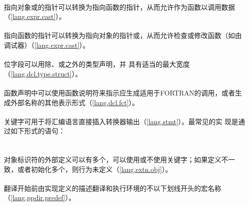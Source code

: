 \paragraph{}
指向对象或的指针可以转换为指向函数的指针，从而允许作为函数以调用数据
（\ref{lang.expr.cast}）。

\paragraph{}
指向函数的指针可以转换为指向对象的指针或，从而允许检查或修改函数（如由
调试器）（\ref{lang.expr.cast}）。

\paragraph{}
位字段可以用除、或之外的类型声明，并
具有适当的最大宽度（\ref{lang.dcl.type.struct}）。

\paragraph{}
函数声明中可以使用函数说明符来指示应生成适用于FORTRAN的调用，或者生
成外部名称的其他表示形式（\ref{lang.dcl.fct}）。

\paragraph{}
关键字可用于将汇编语言直接插入转换器输出（\ref{lang.stmt}）。最常见的实
现是通过如下形式的语句：                                                      \\
\mbox{\hspace{4em}  \tm{);}}

\paragraph{}
对象标识符的外部定义可以有多个，可以使用或不使用关键字；如果定义不一
致，或者初始化多个，则行为未定义（\ref{lang.extn.obj}）。

\paragraph{}
翻译开始前由实现定义的描述翻译和执行环境的不以下划线开头的宏名称
（\ref{lang.ppdir.predef}）。

